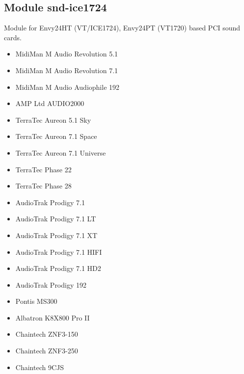 \documentclass[a4paper,8pt,english]{sphinxmanual}
\begin{document}
\subsection{Module snd-ice1724}
\label{sound/alsa-configuration:module-snd-ice1724}
Module for Envy24HT (VT/ICE1724), Envy24PT (VT1720) based PCI sound cards.
\begin{itemize}
\item {} 
MidiMan M Audio Revolution 5.1

\item {} 
MidiMan M Audio Revolution 7.1

\item {} 
MidiMan M Audio Audiophile 192

\item {} 
AMP Ltd AUDIO2000

\item {} 
TerraTec Aureon 5.1 Sky

\item {} 
TerraTec Aureon 7.1 Space

\item {} 
TerraTec Aureon 7.1 Universe

\item {} 
TerraTec Phase 22

\item {} 
TerraTec Phase 28

\item {} 
AudioTrak Prodigy 7.1

\item {} 
AudioTrak Prodigy 7.1 LT

\item {} 
AudioTrak Prodigy 7.1 XT

\item {} 
AudioTrak Prodigy 7.1 HIFI

\item {} 
AudioTrak Prodigy 7.1 HD2

\item {} 
AudioTrak Prodigy 192

\item {} 
Pontis MS300

\item {} 
Albatron K8X800 Pro II

\item {} 
Chaintech ZNF3-150

\item {} 
Chaintech ZNF3-250

\item {} 
Chaintech 9CJS


\end{itemize}
\end{document}
